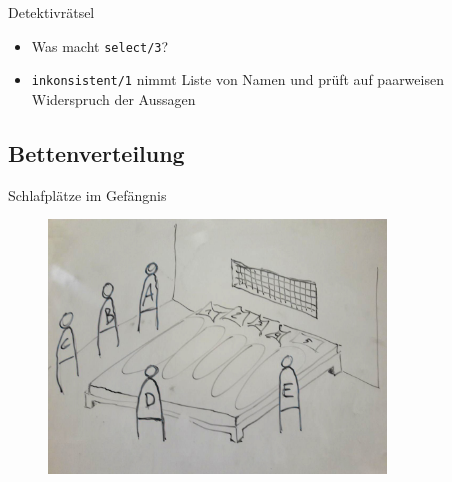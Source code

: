 \documentclass{beamer}
\newcommand{\code}[1]{
	\begin{mdframed}
		
	\end{mdframed}
}
\begin{document}
\begin{frame}{Detektivrätsel}
	\code{demos/detektiv2.pl}
	
	\begin{itemize}
		\item Was macht \texttt{select/3}?
		\item \texttt{inkonsistent/1} nimmt Liste von Namen und prüft auf paarweisen Widerspruch der Aussagen
	\end{itemize}
\end{frame}


\subsection{Bettenverteilung}

\begin{frame}{Schlafplätze im Gefängnis}
	\begin{figure}
		\includegraphics[width=0.8\textwidth]{images/bett}
	\end{figure}
\end{frame}
\end{document}
